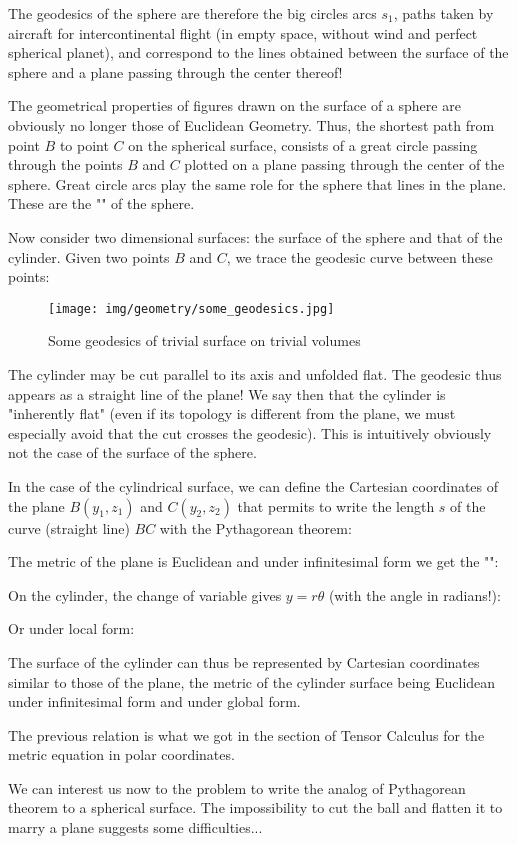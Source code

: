 	The geodesics of the sphere are therefore the big circles arcs $s_1$, paths taken by aircraft for intercontinental flight (in empty space, without wind and perfect spherical planet), and correspond to the lines obtained between the surface of the sphere and a plane passing through the center thereof!
	
	The geometrical properties of figures drawn on the surface of a sphere are obviously no longer those of Euclidean Geometry. Thus, the shortest path from point $B$ to point $C$ on the spherical surface, consists of a great circle passing through the points $B$ and $C$ plotted on a plane passing through the center of the sphere. Great circle arcs play the same role for the sphere that lines in the plane. These are the "" of the sphere.
	
	Now consider two dimensional surfaces: the surface of the sphere and that of the cylinder. Given two points $B$ and $C$, we trace the geodesic curve between these points:
	\begin{figure}[H]
		\centering
		\texttt{[image: img/geometry/some\_geodesics.jpg]}
		\caption{Some geodesics of trivial surface on trivial volumes}
	\end{figure}
	
	The cylinder may be cut parallel to its axis and unfolded flat. The geodesic thus appears as a straight line of the plane! We say then that the cylinder is "inherently flat" (even if its topology is different from the plane, we must especially avoid that the cut crosses the geodesic). This is intuitively obviously not the case of the surface of the sphere.
	
	In the case of the cylindrical surface, we can define the Cartesian coordinates of the plane $B(y_1,z_1)$ and $C(y_2,z_2)$ that permits to write the length $s$ of the curve (straight line) $BC$ with the Pythagorean theorem:
	
	The metric of the plane is Euclidean and under infinitesimal form we get the "":
	
	On the cylinder, the change of variable gives $y=r\theta$ (with the angle in radians!):
	
	Or under local form:
	
	The surface of the cylinder can thus be represented by Cartesian coordinates similar to those of the plane, the metric of the cylinder surface being Euclidean under infinitesimal form and under global form.
	\begin{tcolorbox}[title=Remark,colframe=black,arc=10pt]
	The previous relation is what we got in the section of Tensor Calculus for the metric equation in polar coordinates.
	\end{tcolorbox}
	We can interest us now to the problem to write the analog of Pythagorean theorem to a spherical surface. The impossibility to cut the ball and flatten it to marry a plane suggests some difficulties...
	
